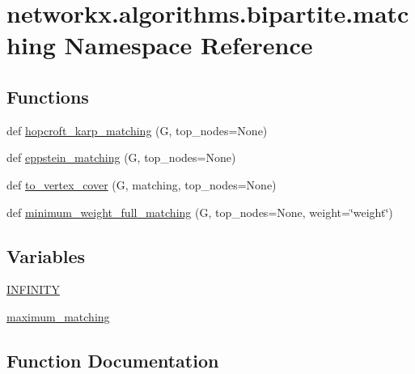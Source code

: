 \hypertarget{namespacenetworkx_1_1algorithms_1_1bipartite_1_1matching}{}\section{networkx.\+algorithms.\+bipartite.\+matching Namespace Reference}
\label{namespacenetworkx_1_1algorithms_1_1bipartite_1_1matching}
\subsection*{Functions}
\begin{DoxyCompactItemize}
\item 
def \hyperlink{namespacenetworkx_1_1algorithms_1_1bipartite_1_1matching_a33efdccdbaa981ba4a114541761fb22e}{hopcroft\+\_\+karp\+\_\+matching} (G, top\+\_\+nodes=None)
\item 
def \hyperlink{namespacenetworkx_1_1algorithms_1_1bipartite_1_1matching_a4e01b7d4fca81449c710c8dc4a14bed5}{eppstein\+\_\+matching} (G, top\+\_\+nodes=None)
\item 
def \hyperlink{namespacenetworkx_1_1algorithms_1_1bipartite_1_1matching_a96c6a1cdd9dd0838060648c8b5cf0514}{to\+\_\+vertex\+\_\+cover} (G, matching, top\+\_\+nodes=None)
\item 
def \hyperlink{namespacenetworkx_1_1algorithms_1_1bipartite_1_1matching_a618396f60731ee676163c1c6899dcf91}{minimum\+\_\+weight\+\_\+full\+\_\+matching} (G, top\+\_\+nodes=None, weight=\char`\"{}weight\char`\"{})
\end{DoxyCompactItemize}
\subsection*{Variables}
\begin{DoxyCompactItemize}
\item 
\hyperlink{namespacenetworkx_1_1algorithms_1_1bipartite_1_1matching_a785e6e3cbcaf6e38680ba55e563bb91b}{I\+N\+F\+I\+N\+I\+TY}
\item 
\hyperlink{namespacenetworkx_1_1algorithms_1_1bipartite_1_1matching_a87e09b799c5153f2b1b4d589e8b80118}{maximum\+\_\+matching}
\end{DoxyCompactItemize}


\subsection{Function Documentation}
\mbox{\label{namespacenetworkx_1_1algorithms_1_1bipartite_1_1matching_a4e01b7d4fca81449c710c8dc4a14bed5}} 
